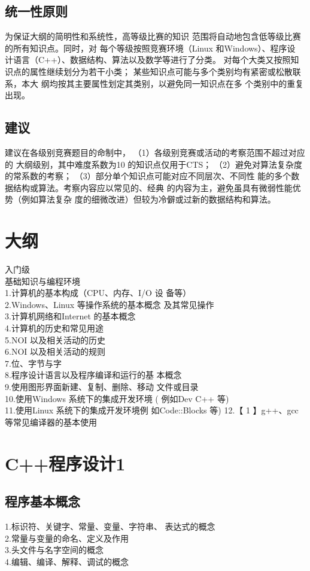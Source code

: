 \documentclass[12pt,twiside,a4paper]{ctexbook}
\numberwithin{chapter}{part}
\begin{document}
\subsection{统一性原则}
为保证大纲的简明性和系统性，高等级比赛的知识
范围将自动地包含低等级比赛的所有知识点。同时，对
每个等级按照竞赛环境（Linux 和Windows）、程序设
计语言（C++）、数据结构、算法以及数学等进行了分类。
对每个大类又按照知识点的属性继续划分为若干小类；
某些知识点可能与多个类别均有紧密或松散联系，本大
纲均按其主要属性划定其类别，以避免同一知识点在多
个类别中的重复出现。
\subsection{建议}
建议在各级别竞赛题目的命制中，
（1）各级别竞赛或活动的考察范围不超过对应的
大纲级别，其中难度系数为10 的知识点仅用于CTS；
（2）避免对算法复杂度的常系数的考察；
（3）部分单个知识点可能对应不同层次、不同性
能的多个数据结构或算法。考察内容应以常见的、经典
的内容为主，避免虽具有微弱性能优势（例如算法复杂
度的细微改进）但较为冷僻或过新的数据结构和算法。
\section{大纲}
入门级\\
基础知识与编程环境\\
1.计算机的基本构成（CPU、内存、I/O 设
备等）\\
2.Windows、Linux 等操作系统的基本概念
及其常见操作\\
3.计算机网络和Internet 的基本概念\\
4.计算机的历史和常见用途\\
5.NOI 以及相关活动的历史\\
6.NOI 以及相关活动的规则\\
7.位、字节与字\\
8.程序设计语言以及程序编译和运行的基
本概念\\
9.使用图形界面新建、复制、删除、移动
文件或目录\\
10.使用Windows 系统下的集成开发环境
( 例如Dev C++ 等)\\
11.使用Linux 系统下的集成开发环境例
如Code::Blocks 等)
12.【 1 】g++、gcc 等常见编译器的基本使用

\section{C++程序设计1}
\subsection{程序基本概念}
1.标识符、关键字、常量、变量、字符串、
表达式的概念\\
2.常量与变量的命名、定义及作用\\
3.头文件与名字空间的概念\\
4.编辑、编译、解释、调试的概念
\end{document}
